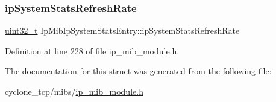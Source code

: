 \subsubsection{\texorpdfstring{ip\+System\+Stats\+Refresh\+Rate}{ipSystemStatsRefreshRate}}
{\footnotesize\ttfamily \hyperlink{stdint_8h_a435d1572bf3f880d55459d9805097f62}{uint32\+\_\+t} Ip\+Mib\+Ip\+System\+Stats\+Entry\+::ip\+System\+Stats\+Refresh\+Rate}



Definition at line 228 of file ip\+\_\+mib\+\_\+module.\+h.



The documentation for this struct was generated from the following file\+:\begin{DoxyCompactItemize}
\item 
cyclone\+\_\+tcp/mibs/\hyperlink{ip__mib__module_8h}{ip\+\_\+mib\+\_\+module.\+h}\end{DoxyCompactItemize}
